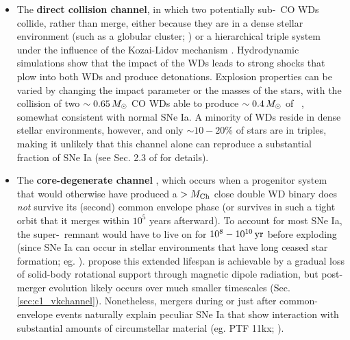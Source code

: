 \begin{itemize}
	\item The {\bf direct collision channel}, in which two potentially sub-\Mch\ CO WDs collide, rather than merge, either because they are in a dense stellar environment (such as a globular cluster; \citealt{benzth89, loreig10}) or a hierarchical triple system \citep{katzd12} under the influence of the Kozai-Lidov mechanism \citep{koza62, lido62}.  Hydrodynamic simulations \citep{rask+10, kush+13, garc+13} show that the impact of the WDs leads to strong shocks that plow into both WDs and produce detonations.  Explosion properties can be varied by changing the impact parameter or the masses of the stars, with the collision of two $\sim0.65\,\Msun$ CO WDs able to produce $\sim0.4\,\Msun$ of \Ni\ \citep{garc+13, kush+13}, somewhat consistent with normal SNe Ia.  A minority of WDs reside in dense stellar environments, however, and only $\sim10-20$\% of stars are in triples, making it unlikely that this channel alone can reproduce a substantial fraction of SNe Ia (see Sec. 2.3 of \citealt{maozmn14} for details).

	\item The {\bf core-degenerate channel} \citep{livir03, kashs11, tsebs15}, which occurs when a progenitor system that would otherwise have produced a $>\Mch$ close double WD binary does \textit{not} survive its (second) common envelope phase (or survives in such a tight orbit that it merges within $10^5$ years afterward).  To account for most SNe Ia, the super-\Mch\ remnant would have to live on for $10^{8}-10^{10}\,\mathrm{yr}$ before exploding (since SNe Ia can occur in stellar environments that have long ceased star formation; eg. \citealt{prichs08, maozsg10}).  \cite{illks12} propose this extended lifespan is achievable by a gradual loss of solid-body rotational support through magnetic dipole radiation, but post-merger evolution likely occurs over much smaller timescales (Sec. \ref{sec:c1_vkchannel}).  Nonetheless, mergers during or just after common-envelope events naturally explain peculiar SNe Ia that show interaction with substantial amounts of circumstellar material (eg. PTF 11kx; \citealt{dild+12, soke13}).

\end{itemize}


